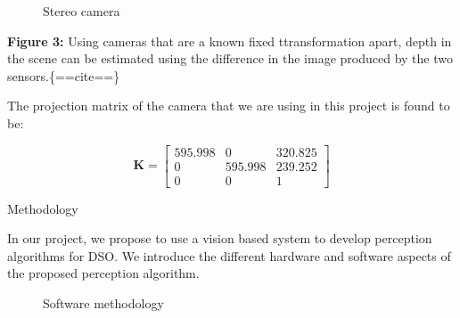 \begin{figure}
\centering
{}
\caption{Stereo camera}
\end{figure}

\textbf{Figure 3:} Using cameras that are a known fixed ttransformation
apart, depth in the scene can be estimated using the difference in the
image produced by the two sensors.\{==cite==\}

The projection matrix of the camera that we are using in this project is
found to be:

\[\mathbf{K} = \begin{bmatrix} 595.998 & 0 & 320.825 \\
0 & 595.998 &239.252 \\
0 & 0 &1\end{bmatrix} \]

Methodology

In our project, we propose to use a vision based system to develop
perception algorithms for DSO. We introduce the different hardware and
software aspects of the proposed perception algorithm.

\begin{figure}
\centering
{}
\caption{Software methodology}
\end{figure}

